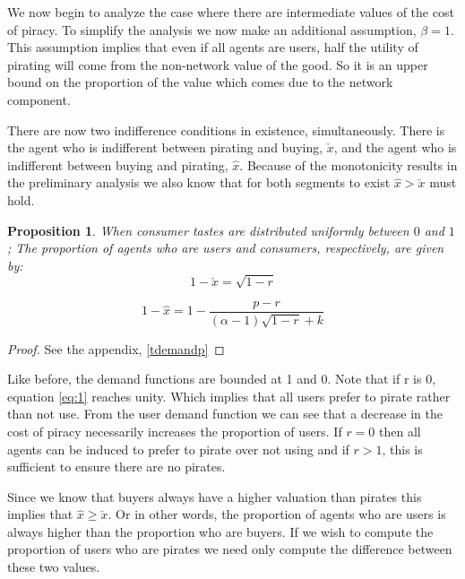 \documentclass[11pt]{article}
\newtheorem{proposition}{Proposition}
\begin{document}
We now begin to analyze the case where there are intermediate values of the cost of piracy. To simplify the analysis we now make an additional assumption, $\beta=1$. This assumption implies that even if all agents are users, half the utility of pirating will come from the non-network value of the good. So it is an upper bound on the proportion of the value which comes due to the network component. 

There are now two indifference conditions in existence, simultaneously. There is the agent who is indifferent between pirating and buying, $\check{x}$, and the agent who is indifferent between buying and pirating, $\hat{x}$. Because of the monotonicity results in the preliminary analysis we also know that for both segments to exist $\hat{x}>\check{x}$ must hold.  

\begin{proposition}
\label{tdemand}
When consumer tastes are distributed uniformly between $0$ and $1$;  The proportion of agents who are users and consumers, respectively, are given by:
\begin{equation}\label{eq:1}
1 -\check{x} = \sqrt{1-r}
\end{equation}

\begin{equation}\label{eq:2}
1 - \hat{x}= 1 - \frac{p-r}{(\alpha - 1) \sqrt{1-r} +k}
\end{equation}


\end{proposition}

\begin{proof}
See the appendix, \ref{tdemandp}
\end{proof}

Like before, the demand functions are bounded at 1 and 0. Note that if r is 0, equation \ref{eq:1} reaches unity. Which implies that all users prefer to pirate rather than not use. From the user demand function we can see that a decrease in the cost of piracy necessarily increases the proportion of users. If $r=0$ then all agents can be induced to prefer to pirate over not using and if $r>1$, this is sufficient to ensure there are no pirates. 

Since we know that buyers always have a higher valuation than pirates this implies that $\hat{x} \geq \check{x}$. Or in other words, the proportion of agents who are users is always higher than the proportion who are buyers. If we wish to compute the proportion of users who are pirates we need only compute the difference between these two values. 
\end{document}
